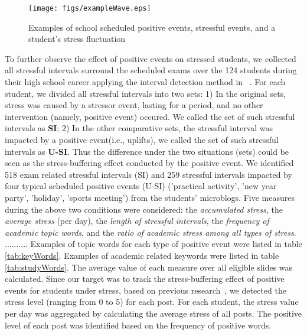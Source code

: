 \begin{figure}[H]
\centering
\texttt{[image: figs/exampleWave.eps]}
\caption{\small{Examples of school scheduled positive events, stressful events, and a student's stress fluctuation}}
\label{fig:example}
\end{figure}

To further observe the effect of positive events on stressed students,
we collected all stressful intervals surround the scheduled exams over the 124 students during their high school career
applying the interval detection method in ~\citep{Li2017Analyzing}. 
For each student, we divided all stressful intervals into two sets: 
1) In the original sets, stress was caused by a stressor event, lasting for a period,
and no other intervention (namely, positive event) occured.
We called the set of such stressful intervals as \textbf{SI};
2) In the other comparative sets,
the stressful interval was impacted by a positive event(i.e., uplifts),
we called the set of such stressful intervals as \textbf{U-SI}.
Thus the difference under the two situations (sets) could be seen as the stress-buffering effect
conducted by the positive event. 
We identified 518 exam related stressful intervals (SI)
and 259 stressful intervals impacted by four typical scheduled positive events (U-SI)
('practical activity', 'new year party', 'holiday', 'sports meeting') from the students' microblogs. 
Five measures during the above two conditions were considered:
the \emph{accumulated stress}, the \emph{average stress} (per day), the \emph{length of stressful intervals},
the \emph{frequency of academic topic words}, and the \emph{ratio of academic stress among all types of stress}.
.......... 
Examples of topic words for each type of positive event were listed in table \ref{tab:keyWords}. 
Examples of academic related keywords were listed in table \ref{tab:studyWords}. 
The average value of each measure over all eligible slides was calculated. 
Since our target was to track the stress-buffering effect of positive events for students under stress, 
based on previous research~\cite{XueUbicomp13}, 
we detected the stress level (ranging from 0 to 5) for each post.
For each student,
the stress value per day was aggregated by calculating the average stress of all posts. 
The positive level of each post was identified based on the frequency of positive words. 

